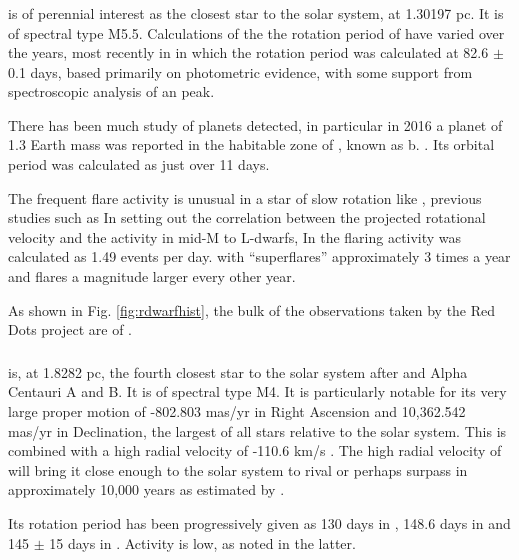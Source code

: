 \subsubsection{\prox}

{\prox} is of perennial interest as the closest star to the solar system, at 1.30197 pc. It is of spectral type M5.5.
Calculations of the the rotation period of {\prox} have varied over the years,
most recently in \citet{collins17} in which the rotation period was calculated
at 82.6 $\pm$ 0.1 days, based primarily on photometric evidence, with some
support from spectroscopic analysis of an {\ha} peak.

There has been much study of planets detected, in particular in 2016 a planet of 1.3 Earth mass was reported
in the habitable zone of \prox, known as {\prox} b. \citep{angladaescude16}.
Its orbital period was calculated as just over 11 days.

The frequent flare activity is unusual in a star of slow rotation like \prox,
previous studies such as In \citet{mohanty03} setting out the correlation
between the projected rotational velocity {\vsini} and the
activity in mid-M to L-dwarfs, In \citet{vida19} the flaring activity was
calculated as 1.49 events per day. with ``superflares'' approximately 3 times a
year and flares a magnitude larger every other year.

As shown in Fig. \ref{fig:rdwarfhist}, the bulk of
the observations taken by the Red Dots project are of \prox.

\subsubsection{\bstar}
\protect\label{section:introbstar}
{\bstar} is, at 1.8282 pc, the fourth closest star to the solar system after {\prox} and Alpha Centauri A and B.
It is of spectral type M4. It is particularly notable for its very large proper motion of {-}802.803 mas/yr
in Right Ascension and 10,362.542 mas/yr in Declination, the largest of all stars relative to the solar system.
This is combined with a high radial velocity of {-}110.6 km/s \citep{bobylev17}.
The high radial velocity of {\bstar} will bring it close enough to the solar
system to rival or perhaps surpass {\prox} in approximately 10,000 years as estimated by \citet{bobylev10}.

Its rotation period has been progressively given as 130 days in \citet{benedict98}, 148.6 days in \citet{suarezmascareno15} 
and 145 $\pm$ 15 days in \citet{toledopadron18}. Activity is low, as noted in the latter.

